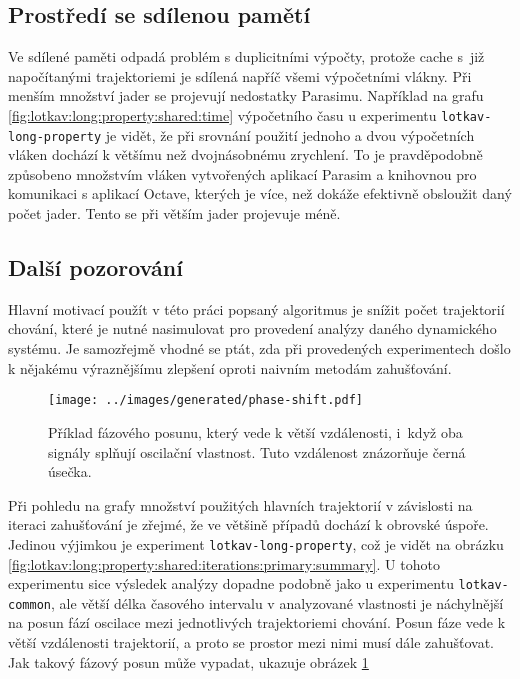 \subsection{Prostředí se sdílenou pamětí}

Ve sdílené paměti odpadá problém s duplicitními výpočty, protože cache s~již napočítanými
trajektoriemi je sdílená napříč všemi výpočetními vlákny. Při menším množství jader se
projevují nedostatky Parasimu. Například na grafu \ref{fig:lotkav:long:property:shared:time} výpočetního času u experimentu \texttt{lotkav-long-property}
je vidět, že při srovnání použití jednoho a dvou výpočetních vláken dochází k většímu
než dvojnásobnému zrychlení. To je pravděpodobně způsobeno množstvím vlá\-ken vytvořených
aplikací Parasim a knihovnou pro komunikaci s aplikací Octave, kterých je více,
než dokáže efektivně obsloužit daný počet jader. Tento  se
při větším jader projevuje méně.

\subsection{Další pozorování}

Hlavní motivací použít v této práci popsaný algoritmus je snížit počet trajektorií
chování, které je nutné nasimulovat pro provedení analýzy daného dynamického systému.
Je samozřejmě vhodné se ptát, zda při provedených experimentech došlo k nějakému
výraznějšímu zlepšení oproti naivním metodám zahušťování. 

\begin{figure}[h!]
\begin{center}
	\texttt{[image: ../images/generated/phase-shift.pdf]}
	\caption{Příklad fázového posunu, který vede k větší vzdálenosti, i~když oba signály splňují oscilační vlastnost. Tuto vzdálenost znázorňuje černá úsečka.}
	\label{fig:phase:shift}
\end{center}
\end{figure}

Při pohledu na grafy množství použitých hlavních trajektorií v závislosti na iteraci
zahušťování je zřejmé, že ve většině případů dochází k obrovské úspoře. Jedinou výjimkou
je experiment \texttt{lotkav-long-property}, což je vidět na obrázku \ref{fig:lotkav:long:property:shared:iterations:primary:summary}.
U tohoto experimentu sice výsledek analýzy dopadne podobně jako u experimentu \texttt{lotkav-common},
ale větší délka časového intervalu v analyzované vlastnosti je náchylnější na posun fází oscilace
mezi jednotlivých trajektoriemi chování. Posun fáze vede k větší vzdálenosti trajektorií,
a proto se prostor mezi nimi musí dále zahušťovat. Jak takový fázový posun může vypadat, ukazuje
obrázek \ref{fig:phase:shift}

